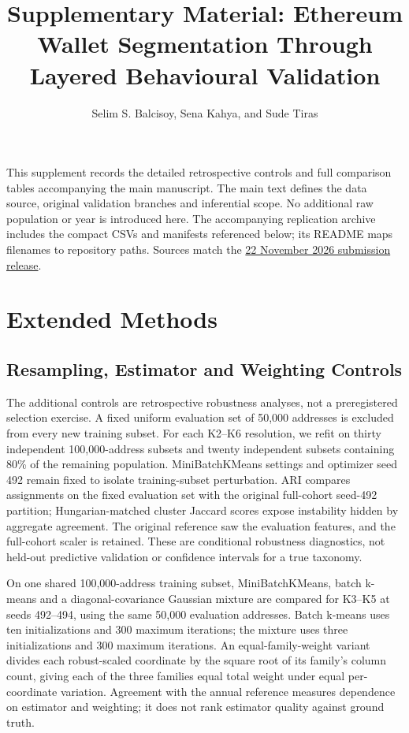 \documentclass[journal,letterpaper]{IEEEtran}
\title{Supplementary Material: Ethereum Wallet Segmentation Through Layered Behavioural Validation}
\author{Selim S. Balcisoy, Sena Kahya, and Sude Tiras}
\begin{document}
\maketitle
This supplement records the detailed retrospective controls and full comparison tables accompanying the main manuscript. The main text defines the data source, original validation branches and inferential scope. No additional raw population or year is introduced here. The accompanying replication archive includes the compact CSVs and manifests referenced below; its README maps filenames to repository paths. Sources match the \href{https://github.com/sudentrs/ethereum-wallet-behaviour-segmentation/tree/tcss-submission-2026-11-22-v2}{22 November 2026 submission release}.
\section{Extended Methods}
\subsection{Resampling, Estimator and Weighting Controls}
The additional controls are retrospective robustness analyses, not a preregistered selection exercise. A fixed uniform evaluation set of 50,000 addresses is excluded from every new training subset. For each K2--K6 resolution, we refit on thirty independent 100,000-address subsets and twenty independent subsets containing 80\% of the remaining population. MiniBatchKMeans settings and optimizer seed 492 remain fixed to isolate training-subset perturbation. ARI compares assignments on the fixed evaluation set with the original full-cohort seed-492 partition; Hungarian-matched cluster Jaccard scores expose instability hidden by aggregate agreement. The original reference saw the evaluation features, and the full-cohort scaler is retained. These are conditional robustness diagnostics, not held-out predictive validation or confidence intervals for a true taxonomy.

On one shared 100,000-address training subset, MiniBatchKMeans, batch k-means and a diagonal-covariance Gaussian mixture are compared for K3--K5 at seeds 492--494, using the same 50,000 evaluation addresses. Batch k-means uses ten initializations and 300 maximum iterations; the mixture uses three initializations and 300 maximum iterations. An equal-family-weight variant divides each robust-scaled coordinate by the square root of its family's column count, giving each of the three families equal total weight under equal per-coordinate variation. Agreement with the annual reference measures dependence on estimator and weighting; it does not rank estimator quality against ground truth.
\end{document}
